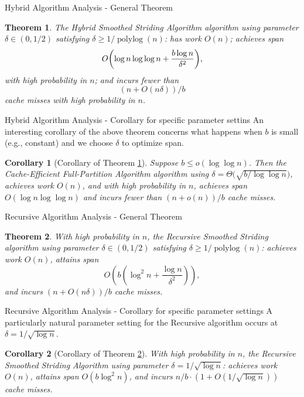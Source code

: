 \documentclass{beamer}
\DeclarePairedDelimiter{\paren}{(}{)}
\newcommand{\polylog}{\operatorname{polylog}}
\newtheorem{cor}{Corollary}
\newtheorem{thm}{Theorem}
\begin{document}
\begin{frame}[t]{Hybrid Algorithm Analysis - General Theorem}
\begin{thm}
	\label{thm:fullPartition}
	The Hybrid Smoothed Striding Algorithm algorithm using parameter $\delta\in(0,1/2)$ satisfying $\delta \ge 1/\polylog(n)$: has work $O(n)$; achieves span
        $$O\paren*{\log n \log\log n +\frac{b\log n}{\delta^2}},$$
with high probability in $n$; and incurs fewer than 
$$(n+O(n\delta))/b$$
cache misses with high probability in $n$.
\end{thm}
\end{frame}

\begin{frame}[t]{Hybrid Algorithm Analysis - Corollary for specific parameter settins}
An interesting corollary of the above theorem concerns what happens when $b$ is small (e.g., constant) and we choose $\delta$ to optimize span. 
\begin{cor}[Corollary of Theorem \ref{thm:fullPartition}]
	\label{cor:fullPartition}
Suppose $b \le o(\log \log n)$. Then the Cache-Efficient Full-Partition Algorithm algorithm using $\delta = \Theta\big(\sqrt{b/\log\log n}\big)$, achieves work $O(n)$, and with high probability in $n$, achieves span $O(\log n \log\log n)$ and incurs fewer than $(n+o(n))/b$ cache misses.
\end{cor}
\end{frame}


\begin{frame}[t]{Recursive Algorithm Analysis - General Theorem}
	\begin{thm}
	\label{thm:groupedPartitionAlg}
	With high probability in $n$, the Recursive Smoothed Striding
        algorithm using parameter $\delta \in(0,1/2)$ satisfying
        $\delta \ge 1 / \polylog(n)$: achieves work $O(n)$, attains span
	$$O\left(b\left(\log^2 n + \frac{\log n}{\delta^2}\right)\right),$$
	and incurs $(n+O(n \delta))/b$ cache misses. 
\end{thm}
\end{frame}

\begin{frame}[t]{Recursive Algorithm Analysis - Corollary for specific parameter settings}
A particularly natural parameter setting for the Recursive algorithm occurs at $\delta = 1 / \sqrt{\log n}$.
\begin{cor}[Corollary of Theorem \ref{thm:groupedPartitionAlg}]
  \label{cor:groupedPartitionAlg}
	With high probability in $n$, the Recursive Smoothed Striding Algorithm using parameter $\delta=1/\sqrt{\log n}$:
  achieves work $O(n)$, attains span $O(b\log^2 n)$, and incurs $n/b \cdot (1 + O(1 / \sqrt{\log n}))$ cache misses. 
\end{cor}
\end{frame}
\end{document}

